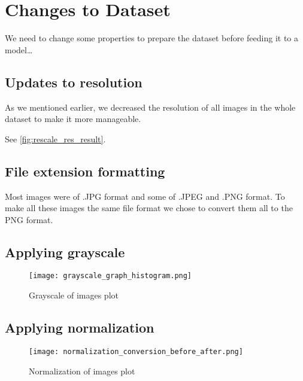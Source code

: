 
\section{Changes to Dataset} %
\begin{fullwidth}We need to change some properties to prepare the dataset before feeding it to a model\dots\end{fullwidth}

\subsection{Updates to resolution}
\begin{fullwidth}As we mentioned earlier, we decreased the resolution of all images in the whole dataset to make it more manageable. \end{fullwidth}
See \ref{fig:rescale_res_result}.

\subsection{File extension formatting}
\begin{fullwidth}
Most images were of .JPG format and some of .JPEG and .PNG format. To make all these images the same file format we chose to convert them all to the PNG format. 
\end{fullwidth}

\subsection{Applying grayscale}
\begin{figure}[H] %
	\texttt{[image: grayscale\_graph\_histogram.png]}
	\caption{Grayscale of images plot}
	\label{fig:grayscale_graph_histogram} %
\end{figure}

\newpage
\subsection{Applying normalization}
\begin{figure}[H] %
	\texttt{[image: normalization\_conversion\_before\_after.png]}
	\caption{Normalization of images plot}
	\label{fig:normalization_conversion_before_after} %
\end{figure}

